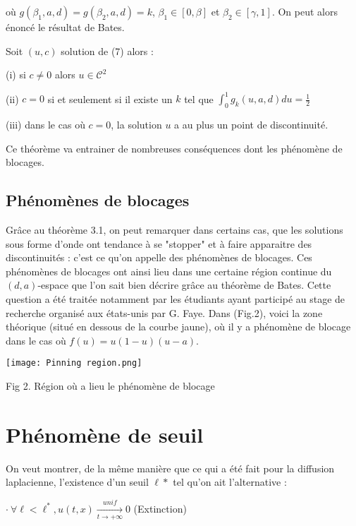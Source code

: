\documentclass{article}
\begin{document}
\noindent où $g(\beta_1,a,d) = g(\beta_2,a,d) = k$, $\beta_1 \in [0,\beta]$ et $\beta_2 \in [\gamma,1]$. On peut alors énoncé le résultat de Bates.

\begin{Theoreme}[Bates 97]
	Soit $(u,c)$ solution de (7) alors : 

	(i) si $c \neq 0 $ alors $u \in \mathcal{C}^2$

	(ii) $c=0$ si et seulement si il existe un $k$ tel que $\int_0^1 g_k(u,a,d)du = \frac{1}{2}$

	(iii)  dans le cas où $c=0$, la solution $u$ a au plus un point de discontinuité. 
\end{Theoreme}

Ce théorème va entrainer de nombreuses conséquences dont les phénomène de blocages.

\subsection{Phénomènes de blocages}

Grâce au théorème 3.1, on peut remarquer dans certains cas, que les solutions sous forme d'onde ont tendance à se "stopper" et à faire apparaitre des discontinuités : c'est ce qu'on appelle des phénomènes de blocages. Ces phénomènes de blocages ont ainsi lieu dans une certaine région continue du $(d,a)$-espace que l'on sait bien décrire grâce au théorème de Bates. Cette question a été traitée notamment par les étudiants ayant participé au stage de recherche organisé aux états-unis par G. Faye. Dans (Fig.2), voici la zone théorique (situé en dessous de la courbe jaune), où il y a phénomène de blocage dans le cas où $f(u) = u(1-u)(u-a)$.

\begin{center}
\texttt{[image: Pinning region.png]}

Fig 2. Région où a lieu le phénomène de blocage
\end{center}

\section{Phénomène de seuil} 
On veut montrer, de la même manière que ce qui a été fait pour la diffusion laplacienne, l'existence d'un seuil $\ell *$ tel qu'on ait l'alternative :

$\cdot~ \forall \ell < \ell^* , u(t,x) \underset{t \to +\infty}{\overset{unif}{\longrightarrow}}0$ (Extinction)
\end{document}
